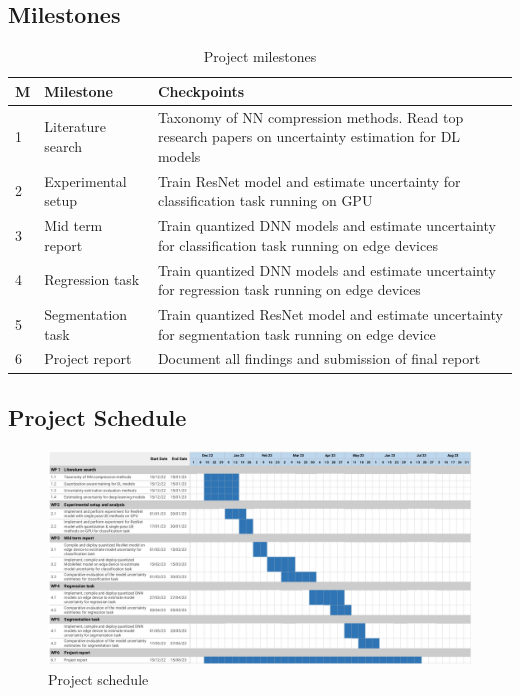 \documentclass[rnd]{mas_proposal}
\begin{document}
\subsection{Milestones}
    \begin{table}[H]
       \begin{tabular}{|m{0.35cm}|m{3cm}|m{10cm}|}
       \hline
       \textbf{M} & \textbf{Milestone} & \textbf{Checkpoints} \\
       \hline
       1 & Literature search & Taxonomy of NN compression methods. Read top research papers on uncertainty estimation for DL models\\
       \hline
       2 & Experimental setup & Train ResNet model and estimate uncertainty for classification task running on GPU\\
       \hline
       3 & Mid term report  &  Train quantized DNN models and estimate uncertainty for classification task running on edge devices\\
       \hline
       4 & Regression task & Train quantized DNN models and estimate uncertainty for regression task running on edge devices\\
       \hline
       5 & Segmentation task & Train quantized ResNet model and estimate uncertainty for segmentation task running on edge device\\
       \hline
       6 & Project report & Document all findings and submission of final report\\
       \hline
       \end{tabular}
        \caption{Project milestones}
        \label{tab:my_label}
    \end{table}


\subsection{Project Schedule}
\begin{figure}[h!]
    \includegraphics[width=\textwidth]{images/R&D Gantt Chart_V3.png}
    \caption{Project schedule}
    \label{fig:myfigure}
\end{figure}
\end{document}
